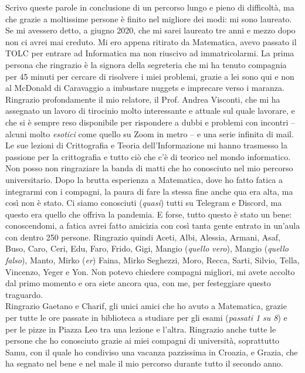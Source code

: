 
Scrivo queste parole in conclusione di un percorso lungo e pieno di difficoltà, ma che grazie a moltissime persone è finito nel migliore dei modi: mi sono laureato. Se mi avessero detto, a giugno 2020, che mi sarei laureato tre anni e mezzo dopo non ci avrei mai creduto. Mi ero appena ritirato da Matematica, avevo passato il TOLC per entrare ad Informatica ma non riuscivo ad immatricolarmi. La prima persona che ringrazio è la signora della segreteria che mi ha tenuto compagnia per 45 minuti per cercare di risolvere i miei problemi, grazie a lei sono qui e non al McDonald di Caravaggio a imbustare nuggets e imprecare verso i maranza. \\

\noindent Ringrazio profondamente il mio relatore, il Prof. Andrea Visconti, che mi ha assegnato un lavoro di tirocinio molto interessante e attuale sul quale lavorare, e che si è sempre reso disponibile per rispondere a dubbi e problemi con incontri -- alcuni molto \textit{esotici} come quello su Zoom in metro -- e una serie infinita di mail. Le sue lezioni di Crittografia e Teoria dell'Informazione mi hanno trasmesso la passione per la crittografia e tutto ciò che c'è di teorico nel mondo informatico. \\

\noindent Non posso non ringraziare la banda di matti che ho conosciuto nel mio percorso universitario. Dopo la brutta esperienza a Matematica, dove ho fatto fatica a integrarmi con i compagni, la paura di fare la stessa fine anche qua era alta, ma così non è stato. Ci siamo conosciuti (\textit{quasi}) tutti su Telegram e Discord, ma questo era quello che offriva la pandemia. E forse, tutto questo è stato un bene: conoscendomi, a fatica avrei fatto amicizia con così tanta gente entrato in un'aula con dentro 250 persone. Ringrazio quindi Aceti, Albi, Alessia, Armani, Asaf, Buso, Caro, Ceri, Edu, Faro, Frido, Gigi, Mangio (\textit{quello vero}), Mangio (\textit{quello falso}), Manto, Mirko (\textit{er}) Faina, Mirko Seghezzi, Moro, Recca, Sarti, Silvio, Tella, Vincenzo, Yeger e Yon. Non potevo chiedere compagni migliori, mi avete accolto dal primo momento e ora siete ancora qua, con me, per festeggiare questo traguardo. \\

\noindent Ringrazio Gaetano e Charif, gli unici amici che ho avuto a Matematica, grazie per tutte le ore passate in biblioteca a studiare per gli esami (\textit{passati 1 su 8}) e per le pizze in Piazza Leo tra una lezione e l'altra. Ringrazio anche tutte le persone che ho conosciuto grazie ai miei compagni di università, soprattutto Samu, con il quale ho condiviso una vacanza pazzissima in Croazia, e Grazia, che ha segnato nel bene e nel male il mio percorso durante tutto il secondo anno. \\

